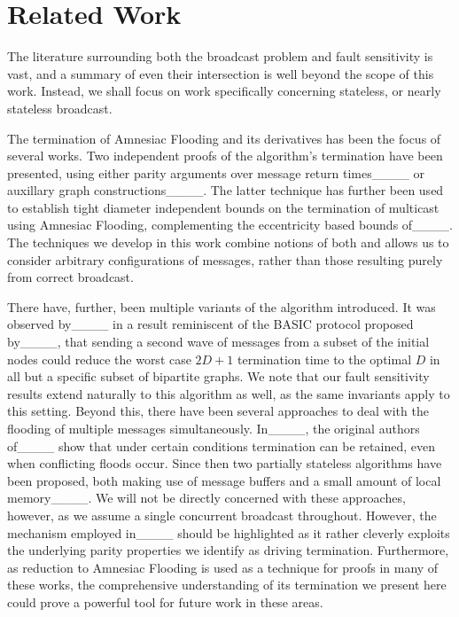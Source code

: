\section{Related Work}
\label{sec: relatedwork}
The literature surrounding both the broadcast problem and fault sensitivity is vast, and a summary of even their intersection is well beyond the scope of this work. Instead, we shall focus on work specifically concerning stateless, or nearly stateless broadcast.

The termination of Amnesiac Flooding and its derivatives has been the focus of several works. Two independent proofs of the algorithm's termination have been presented, using either parity arguments over message return times____ or auxillary graph constructions____. The latter technique has further been used to establish tight diameter independent bounds on the termination of multicast using Amnesiac Flooding, complementing the eccentricity based bounds of____. The techniques we develop in this work combine notions of both and allows us to consider arbitrary configurations of messages, rather than those resulting purely from correct broadcast. 

There have, further, been multiple variants of the algorithm introduced. It was observed by____ in a result reminiscent of the BASIC protocol proposed by____, that sending a second wave of messages from a subset of the initial nodes could reduce the worst case $2D+1$ termination time to the optimal $D$ in all but a specific subset of bipartite graphs. We note that our fault sensitivity results extend naturally to this algorithm as well, as the same invariants apply to this setting. Beyond this, there have been several approaches to deal with the flooding of multiple messages simultaneously. In____, the original authors of____ show that under certain conditions termination can be retained, even when conflicting floods occur. Since then two partially stateless algorithms have been proposed, both making use of message buffers and a small amount of local memory____. We will not be directly concerned with these approaches, however, as we assume a single concurrent broadcast throughout. However, the mechanism employed in____ should be highlighted as it rather cleverly exploits the underlying parity properties we identify as driving termination. Furthermore, as reduction to Amnesiac Flooding is used as a technique for proofs in many of these works, the comprehensive understanding of its termination we present here could prove a powerful tool for future work in these areas.

